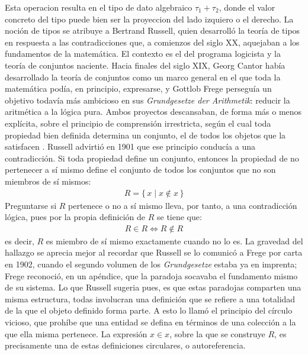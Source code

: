 \documentclass[a4paper,12pt]{report}
\theoremstyle{definition}
\theoremstyle{plain}
\theoremstyle{remark}
\begin{document}
Esta operacion resulta en el tipo de dato algebraico $\tau_1 + \tau_2$, donde el valor concreto del tipo puede bien ser la proyeccion del lado izquiero o el derecho.
\newline
\newline
\indent La noción de tipos se atribuye a Bertrand Russell, quien desarrolló la teoría de tipos en respuesta a las contradicciones que, a comienzos del siglo XX, aquejaban a los fundamentos de la matemática. El contexto es el del programa logicista y la teoría de conjuntos naciente. Hacia finales del siglo XIX, Georg Cantor había desarrollado la teoría de conjuntos como un marco general en el que toda la matemática podía, en principio, expresarse, y Gottlob Frege perseguía un objetivo todavía más ambicioso en sus \textit{Grundgesetze der Arithmetik}: reducir la aritmética a la lógica pura. Ambos proyectos descansaban, de forma más o menos explícita, sobre el principio de comprensión irrestricta, según el cual toda propiedad bien definida determina un conjunto, el de todos los objetos que la satisfacen \citep{sep-type-theory}.
\newline
\newline
\indent Russell advirtió en 1901 que ese principio conducía a una contradicción. Si toda propiedad define un conjunto, entonces la propiedad de no pertenecer a sí mismo define el conjunto de todos los conjuntos que no son miembros de sí mismos:
\begin{align}
  R = \{\, x \mid x \notin x \,\}
\end{align}
Preguntarse si $R$ pertenece o no a sí mismo lleva, por tanto, a una contradicción lógica, pues por la propia definición de $R$ se tiene que:
\begin{align}
  R \in R \iff R \notin R
\end{align}
es decir, $R$ es miembro de sí mismo exactamente cuando no lo es. La gravedad del hallazgo se aprecia mejor al recordar que Russell se lo comunicó a Frege por carta en 1902, cuando el segundo volumen de los \textit{Grundgesetze} estaba ya en imprenta; Frege reconoció, en un apéndice, que la paradoja socavaba el fundamento mismo de su sistema. 
\newline
\newline
\indent Lo que Russell sugeria pues, es que estas paradojas comparten una misma estructura, todas involucran una definición que se refiere a una totalidad de la que el objeto definido forma parte. A esto lo llamó el principio del círculo vicioso, que prohíbe que una entidad se defina en términos de una colección a la que ella misma pertenece. La expresión $x \in x$, sobre la que se construye $R$, es precisamente una de estas definiciones circulares, o autoreferencia.
\end{document}
